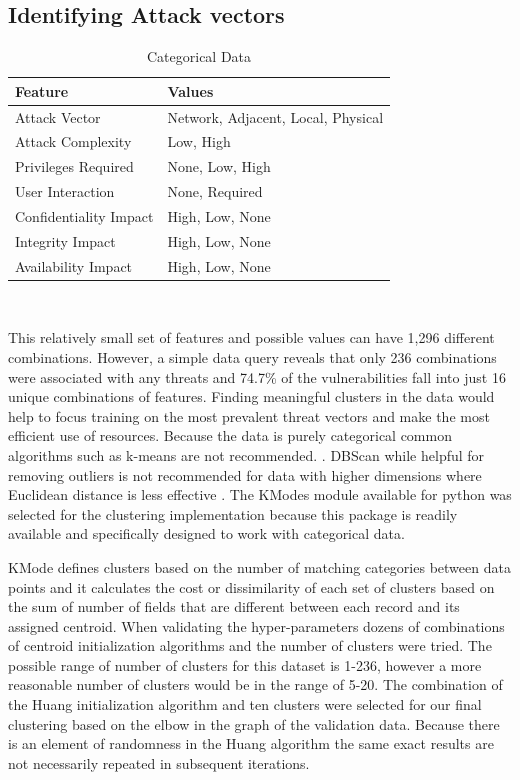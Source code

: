 \documentclass{article} %
\begin{document}
\subsection{Identifying Attack vectors}
\begin{table}[h!]
\begin{center}
\begin{tabular}{ |l|l| } \hline
Feature & Values\\\hline
Attack Vector & Network, Adjacent, Local, Physical  \\ 
Attack Complexity & Low, High  \\ 
Privileges Required & None, Low, High  \\ 
User Interaction & None, Required  \\ 
Confidentiality Impact & High, Low, None\\
Integrity Impact & High, Low, None\\
Availability Impact & High, Low, None\\
\hline
\end{tabular}
\end{center}
\caption{Categorical Data} \\
\label{table:1}
\end{table}

This relatively small set of features and possible values can have 1,296 different combinations.  However, a simple data query reveals that only 236 combinations were associated with any threats and 74.7\% of the vulnerabilities fall into just 16 unique combinations of features.  Finding meaningful clusters in the data would help to focus training on the most prevalent threat vectors and make the most efficient use of resources.  
Because the data is purely categorical common algorithms such as k-means are not recommended. \cite{}.  DBScan while helpful for removing outliers is not recommended for data with higher dimensions where Euclidean distance is less effective \cite{}.  The KModes module available for python was selected for the clustering implementation \cite{https://pypi.org/project/kmodes/}  because this package is readily available and specifically designed to work with categorical data.

KMode defines clusters based on the number of matching categories between data points and it calculates the cost or dissimilarity of each set of clusters based on the sum of number of fields that are different between each record and its assigned centroid.  When validating the hyper-parameters dozens of combinations of centroid initialization algorithms and the number of clusters were tried.  The possible range of number of clusters for this dataset is 1-236, however a more reasonable number of clusters would be in the range of 5-20.  The combination of the Huang initialization algorithm and ten clusters were selected for our final clustering based on the elbow in the graph of the validation data.  Because there is an element of randomness in the Huang algorithm the same exact results are not necessarily repeated in subsequent iterations.
\end{document}
